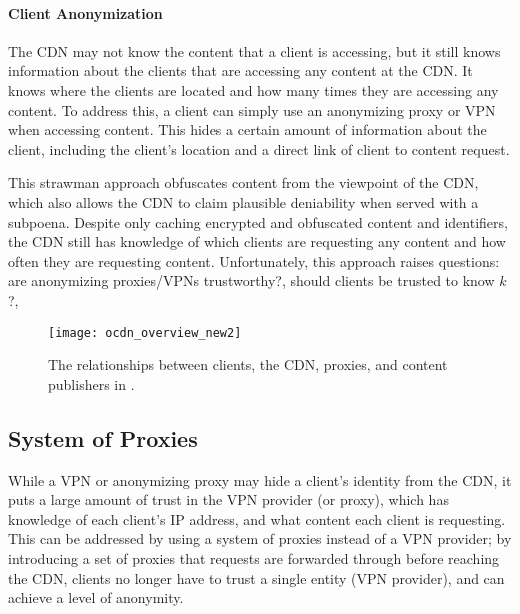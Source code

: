 \paragraph{Client Anonymization}  The CDN may not know the content that a client is accessing, but it 
still knows information about the clients that are accessing any content at the CDN.  It knows 
where the clients are located and how many times they are accessing any content.  To address this, 
a client can simply use an anonymizing proxy or VPN when accessing content.  This hides a certain 
amount of information about the client, including the client's location and a direct link of 
client to content request.

This strawman approach obfuscates content from the viewpoint of the CDN, which also allows the CDN 
to claim plausible deniability when served with a subpoena.  Despite only caching encrypted and obfuscated 
content and identifiers, the CDN still has knowledge of which clients are requesting any content and how often 
they are requesting content.  Unfortunately, this approach raises 
 questions: are anonymizing proxies/VPNs trustworthy?, should clients be trusted to know $k$?, 

\begin{figure}[t!]
\centering
\texttt{[image: ocdn\_overview\_new2]}
\caption{The relationships between clients, the CDN, proxies, and content publishers in 
\system{}.}
\label{fig:ocd_overview}
\end{figure}

\subsection{System of Proxies}
\label{sec:proxies}

While a VPN or anonymizing proxy may hide a client's identity from the CDN, it puts a large amount of trust in the VPN provider (or proxy), which 
has knowledge of each client's IP address, and what content each client is requesting.  This can be addressed 
by using a system of proxies instead of a VPN provider; by introducing a set of proxies that requests are 
forwarded through before reaching the CDN, clients no longer have to trust a single entity (VPN provider), and 
can achieve a level of anonymity.

